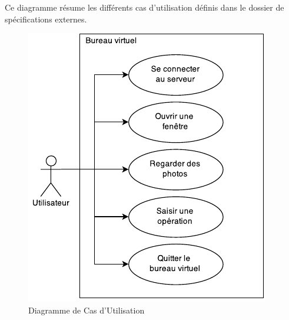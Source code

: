 Ce diagramme résume les différents cas d'utilisation définis dans le dossier de spécifications externes.

\begin{figure}[H]
	\centering
	\includegraphics{diagrammes/DCU.pdf}
	\caption{Diagramme de Cas d'Utilisation}
\end{figure}